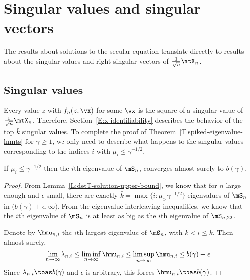 \section{Singular values and singular vectors}\label{S:singular-values-and-vectors}

The results about solutions to the secular equation translate directly
to results about the singular values and right singular vectors of
$\frac{1}{\sqrt{n}} \mtX_n$.

\subsection{Singular values}

Every value $z$ with $f_n(z, \vx)$ for some $\vx$ is the square of a
singular value of $\frac{1}{\sqrt{n}} \mtX_n$.  Therefore,  Section~\ref{E:x-identifiability} describes the behavior of the top $\bar k$ singular values.  To complete the proof of Theorem~\ref{T:spiked-eigenvalue-limits} for $\gamma \geq 1$, we only need to describe what happens to the singular values corresponding to the indices $i$ with $\mu_i \leq \gamma^{-1/2}$.

\begin{lemma}\label{L:eigenvalue-below-threshold-limit}
    If $\mu_i \leq \gamma^{-1/2}$ then the $i$th eigenvalue of
    $\mS_n$, converges almost surely to $b(\gamma)$.
\end{lemma}
\begin{proof}
From Lemma~\ref{L:detT-solution-upper-bound}, we know that for $n$ large
enough and $\epsilon$ small, there are exactly
$\bar k = \max \{ i : \mu_ > \gamma^{-1/2} \}$ eigenvalues of $\mS_n$
in $\big( b(\gamma) + \epsilon, \infty)$.  From the eigenvalue interleaving
inequalities, we know that the $i$th eigenvalue of $\mS_n$ is at least as
big as the $i$th eigenvalue of $\mS_{n,22}$.  

Denote by $\hmu_{n,i}$ the $i$th-largest eigenvalue of $\mS_n$, with
$\bar k < i \leq k$.  Then almost surely,
\[
    \lim_{n\to\infty} \lambda_{n,i} 
        \leq
        \liminf_{n\to\infty} \hmu_{n,i}
        \leq
        \limsup_{n\to\infty} \hmu_{n,i}        
        \leq
        b(\gamma) + \epsilon.
\]
Since $\lambda_{n,i} \toas b(\gamma)$ and $\epsilon$ is arbitrary, this
forces $\hmu_{n,i} \toas b(\gamma)$.
\end{proof}

